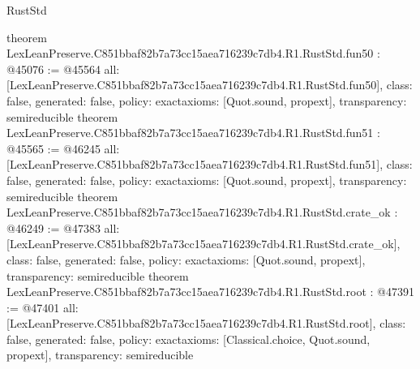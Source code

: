 \begin{lexlean}{RustStd}
\begin{coremodule}
{}
theorem LexLeanPreserve.C851bbaf82b7a73cc15aea716239c7db4.R1.RustStd.fun50 : @45076 := @45564 {
  all: [LexLeanPreserve.C851bbaf82b7a73cc15aea716239c7db4.R1.RustStd.fun50],
  class: false,
  generated: false,
  policy: exact{axioms: [Quot.sound, propext]},
  transparency: semireducible
}
theorem LexLeanPreserve.C851bbaf82b7a73cc15aea716239c7db4.R1.RustStd.fun51 : @45565 := @46245 {
  all: [LexLeanPreserve.C851bbaf82b7a73cc15aea716239c7db4.R1.RustStd.fun51],
  class: false,
  generated: false,
  policy: exact{axioms: [Quot.sound, propext]},
  transparency: semireducible
}
theorem LexLeanPreserve.C851bbaf82b7a73cc15aea716239c7db4.R1.RustStd.crate_ok : @46249 := @47383 {
  all: [LexLeanPreserve.C851bbaf82b7a73cc15aea716239c7db4.R1.RustStd.crate_ok],
  class: false,
  generated: false,
  policy: exact{axioms: [Quot.sound, propext]},
  transparency: semireducible
}
theorem LexLeanPreserve.C851bbaf82b7a73cc15aea716239c7db4.R1.RustStd.root : @47391 := @47401 {
  all: [LexLeanPreserve.C851bbaf82b7a73cc15aea716239c7db4.R1.RustStd.root],
  class: false,
  generated: false,
  policy: exact{axioms: [Classical.choice, Quot.sound, propext]},
  transparency: semireducible
}


\end{coremodule}
\end{lexlean}

